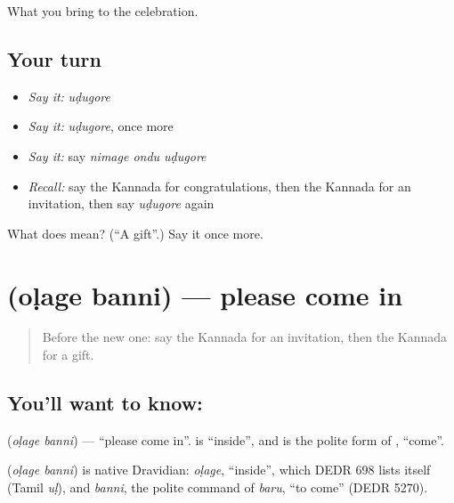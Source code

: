 \begin{grammarlens}[title={What you've built}]
What you bring to the celebration.
\end{grammarlens}

\subsection*{Your turn}
\begin{itemize}
\raggedright
  \item \emph{Say it:} \emph{uḍugore}
  \item \emph{Say it:} \emph{uḍugore}, once more
  \item \emph{Say it:} say \emph{nimage ondu uḍugore}
  \item \emph{Recall:} say the Kannada for congratulations, then the Kannada for an invitation, then say \emph{uḍugore} again
\end{itemize}

\begin{tcolorbox}[breakable,colback=teal!4,colframe=teal!35!black,title={Before you move on}]
What does  mean? (\textquotedblleft{}A gift\textquotedblright{}.) Say it once more.
\end{tcolorbox}
\section[\texorpdfstring{\kn{ಒಳಗೆ} \kn{ಬನ್ನಿ} (oḷage banni)}{ಒಳಗೆ ಬನ್ನಿ (oḷage banni)}]{  (oḷage banni) — please come in}

\label{lesson:KA-C88-comein}



\begin{quote}
Before the new one: say the Kannada for an invitation, then the Kannada for a gift.
\end{quote}

\subsection*{You'll want to know:  }
\textbf{ } (\emph{oḷage banni}) — \textquotedblleft{}please come in\textquotedblright{}. \textbf{} is \textquotedblleft{}inside\textquotedblright{}, and \textbf{} is the polite form of \textbf{}, \textquotedblleft{}come\textquotedblright{}.

\begin{cousinweb}
\textbf{ } (\emph{oḷage banni}) is native Dravidian: \emph{oḷage}, \textquotedblleft{}inside\textquotedblright{}, which DEDR 698 lists itself (Tamil \emph{uḷ}), and \emph{banni}, the polite command of \emph{baru}, \textquotedblleft{}to come\textquotedblright{} (DEDR 5270).
\end{cousinweb}

